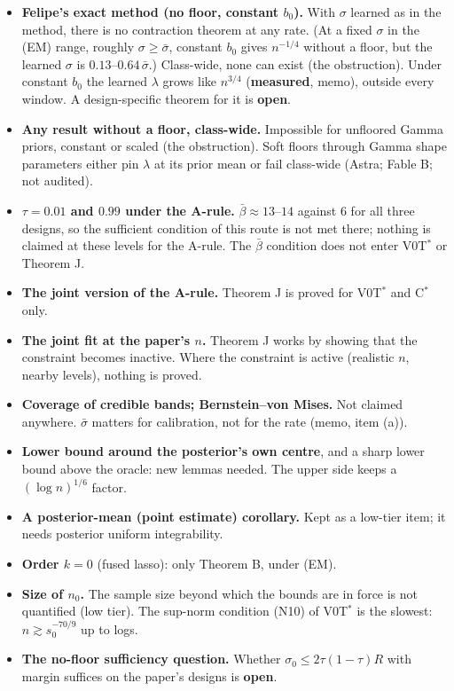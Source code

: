 \documentclass[11pt]{article}
\newcommand{\sbar}{\bar\sigma}
\newcommand{\OP}{\textcolor{open}{\textbf{open}}}
\newcommand{\ME}{\textbf{measured}}
\theoremstyle{plain}
\begin{document}
\begin{itemize}
\item \textbf{Felipe's exact method (no floor, constant $b_0$).} With $\sigma$ learned as in the method, there is no contraction theorem at any rate. (At a fixed $\sigma$ in the (EM) range, roughly $\sigma\ge\sbar$, constant $b_0$ gives $n^{-1/4}$ without a floor, but the learned $\sigma$ is $0.13$--$0.64\,\sbar$.) Class-wide, none can exist (the obstruction). Under constant $b_0$ the learned $\lambda$ grows like $n^{3/4}$ (\ME, memo), outside every window. A design-specific theorem for it is \OP.
\item \textbf{Any result without a floor, class-wide.} Impossible for unfloored Gamma priors, constant or scaled (the obstruction). Soft floors through Gamma shape parameters either pin $\lambda$ at its prior mean or fail class-wide (Astra; Fable B; not audited).
\item \textbf{$\tau=0.01$ and $0.99$ under the A-rule.} $\bar\beta\approx13$--$14$ against $6$ for all three designs, so the sufficient condition of this route is not met there; nothing is claimed at these levels for the A-rule. The $\bar\beta$ condition does not enter V0T$^*$ or Theorem J.
\item \textbf{The joint version of the A-rule.} Theorem J is proved for V0T$^*$ and C$^*$ only.
\item \textbf{The joint fit at the paper's $n$.} Theorem J works by showing that the constraint becomes inactive. Where the constraint is active (realistic $n$, nearby levels), nothing is proved.
\item \textbf{Coverage of credible bands; Bernstein--von Mises.} Not claimed anywhere. $\sbar$ matters for calibration, not for the rate (memo, item (a)).
\item \textbf{Lower bound around the posterior's own centre}, and a sharp lower bound above the oracle: new lemmas needed. The upper side keeps a $(\log n)^{1/6}$ factor.
\item \textbf{A posterior-mean (point estimate) corollary.} Kept as a low-tier item; it needs posterior uniform integrability.
\item \textbf{Order $k=0$} (fused lasso): only Theorem B, under (EM).
\item \textbf{Size of $n_0$.} The sample size beyond which the bounds are in force is not quantified (low tier). The sup-norm condition (N10) of V0T$^*$ is the slowest: $n\gtrsim s_0^{-70/9}$ up to logs.
\item \textbf{The no-floor sufficiency question.} Whether $\sigma_0\le2\tau(1-\tau)R$ with margin suffices on the paper's designs is \OP.
\end{itemize}
\end{document}
